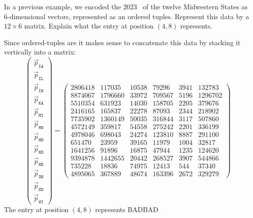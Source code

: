 \documentclass{ximera}
\begin{document}
\begin{example} %
  In a previous example, we encoded the $2023$
  ~of
  the twelve Midwestern States as $6$-dimensional vectors, represented
  as an ordered tuples. Represent this data by a $12\times 6$
  matrix. Explain what the entry at position $(4,8)$ represents.
  \begin{solution}
  Since ordered-tuples are  it makes sense to
  concatenate this data by stacking it vertically into a matrix:
  \[
  \begin{pmatrix}
  \vec{p}_{\texttt{IA}} \\
  \vec{p}_{\texttt{IL}} \\
  \vec{p}_{\texttt{IN}} \\
  \vec{p}_{\texttt{KA}} \\
  \vec{p}_{\texttt{MI}} \\
  \vec{p}_{\texttt{MN}} \\
  \vec{p}_{\texttt{MO}} \\
  \vec{p}_{\texttt{ND}} \\
  \vec{p}_{\texttt{NE}} \\
  \vec{p}_{\texttt{OH}} \\
  \vec{p}_{\texttt{SD}} \\
  \vec{p}_{\texttt{WI}}
  \end{pmatrix}
  =
  \begin{pmatrix}
  2806418 & 117035 & 10538 & 79296 & 3941 & 132783\\
  8874067 & 1796660 & 33972 & 709567 & 5196 & 1296702\\
  5510354 & 631923 & 14030 & 158705 & 2205 & 379676\\
  2416165 & 165837 & 22278 & 87093 & 2344 & 218902\\
  7735902 & 1360149 & 50035 & 316844 & 3117 & 507860\\
  4572149 & 359817 & 54558 & 275242 & 2201 & 336199\\
  4978046 & 698043 & 24274 & 123810 & 8887 & 291100\\
  651470 & 23959 & 39165 & 11979 & 1004 & 32817\\
  1641256 & 91896 & 16875 & 47944 & 1235 & 124620\\
  9394878 & 1442655 & 20442 & 268527 & 3907 & 544866\\
  735228 & 18836 & 74975 & 12413 & 544 & 37340\\
  4895065 & 367889 & 48674 & 163396 & 2672 & 329279
  \end{pmatrix}
  \]
  The entry at position $(4,8)$ represents BADBAD
  \end{solution}
\end{example}
\end{document}
